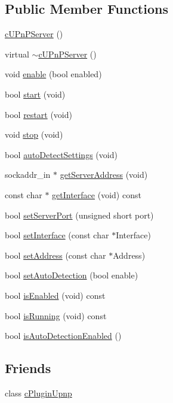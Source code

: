 \subsection*{Public Member Functions}
\begin{CompactItemize}
\item 
\hyperlink{classcUPnPServer_e0277b2231f10e66a5c6ce9acb42fcd0}{cUPnPServer} ()
\item 
virtual \hyperlink{classcUPnPServer_8eb136050f3f6c2edb7acbf5d690723d}{$\sim$cUPnPServer} ()
\item 
void \hyperlink{classcUPnPServer_4935ab1fbcc03279193e0f9fa675fb8b}{enable} (bool enabled)
\item 
bool \hyperlink{classcUPnPServer_811d90c5aadc75bc48670757def1c21e}{start} (void)
\item 
bool \hyperlink{classcUPnPServer_9dd50cfea9042d49ef58b99b44c0c5af}{restart} (void)
\item 
void \hyperlink{classcUPnPServer_c5ecc7ef5d42db1fa136ff00b24d1289}{stop} (void)
\item 
bool \hyperlink{classcUPnPServer_783f27c1997257539ccb8ff7ade815be}{autoDetectSettings} (void)
\item 
sockaddr\_\-in $\ast$ \hyperlink{classcUPnPServer_f938922eff48ca1035e88677e095c0c4}{getServerAddress} (void)
\item 
const char $\ast$ \hyperlink{classcUPnPServer_e28dd555ac861850c9a2bbd22d9a7d3a}{getInterface} (void) const 
\item 
bool \hyperlink{classcUPnPServer_77494ce55a93601110bd4ffce8559b23}{setServerPort} (unsigned short port)
\item 
bool \hyperlink{classcUPnPServer_81cf9d85c09093094febe6966a568702}{setInterface} (const char $\ast$Interface)
\item 
bool \hyperlink{classcUPnPServer_ebebc8d232cf4ad04e5f72f5ab763db6}{setAddress} (const char $\ast$Address)
\item 
bool \hyperlink{classcUPnPServer_7c91df7310a99786a0a126497299d030}{setAutoDetection} (bool enable)
\item 
bool \hyperlink{classcUPnPServer_fbaaebd4496e98106c2d9be4c2512a66}{isEnabled} (void) const 
\item 
bool \hyperlink{classcUPnPServer_af5358b41e19ba2917371c2d118d0145}{isRunning} (void) const 
\item 
bool \hyperlink{classcUPnPServer_389ffe474f61ec18b6f99dd02a9c31e4}{isAutoDetectionEnabled} ()
\end{CompactItemize}
\subsection*{Friends}
\begin{CompactItemize}
\item 
\hypertarget{classcUPnPServer_d07aa2117373999585d4e5530ef02918}{
class \hyperlink{classcUPnPServer_d07aa2117373999585d4e5530ef02918}{cPluginUpnp}}
\label{classcUPnPServer_d07aa2117373999585d4e5530ef02918}

\end{CompactItemize}


